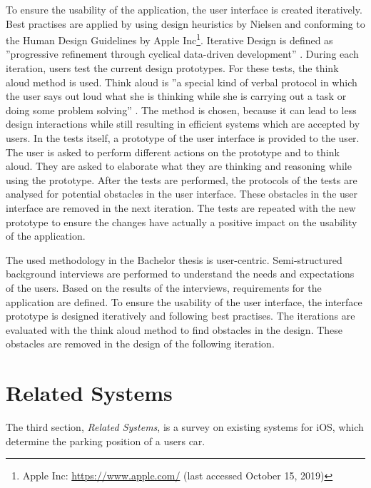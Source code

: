To ensure the usability of the application, the user interface is created iteratively. Best practises are applied by using design heuristics by Nielsen and conforming to the Human Design Guidelines by Apple Inc\footnote{Apple Inc: \url{https://www.apple.com/} (last accessed October 15, 2019)}. Iterative Design is defined as ''progressive refinement through cyclical data-driven development'' \cite{goodman2012observing}. During each iteration, users test the current design prototypes. For these tests, the think aloud method is used. Think aloud is ''a special kind of verbal protocol in which the user says out loud what she is thinking while she is carrying out a task or doing some problem solving'' \cite{nielsen1994usability}. The method is chosen, because it can lead to less design interactions while still resulting in efficient systems which are accepted by users. In the tests itself, a prototype of the user interface is provided to the user. The user is asked to perform different actions on the prototype and to think aloud. They are asked to elaborate what they are thinking and reasoning while using the prototype. After the tests are performed, the protocols of the tests are analysed for potential obstacles in the user interface. These obstacles in the user interface are removed in the next iteration. The tests are repeated with the new prototype to ensure the changes have actually a positive impact on the usability of the application. \cite{Abras2004} \cite{goodman2012observing} \cite{nielsen1994usability} \cite{heurisitcNielsen} \cite{apple:interfaceguidliines} \cite{jaspers2004think} 

The used methodology in the Bachelor thesis is user-centric. Semi-structured background interviews are performed to understand the needs and expectations of the users. Based on the results of the interviews, requirements for the application are defined. To ensure the usability of the user interface, the interface prototype is designed iteratively and following best practises. The iterations are evaluated with the think aloud method to find obstacles in the design. These obstacles are removed in the design of the following iteration. \cite{Abras2004} \cite{wilson2013interview} \cite{heurisitcNielsen} \cite{apple:interfaceguidliines}

\section{Related Systems}
The third section, \textit{Related Systems}, is a survey on existing systems for iOS, which determine the parking position of a users car.


